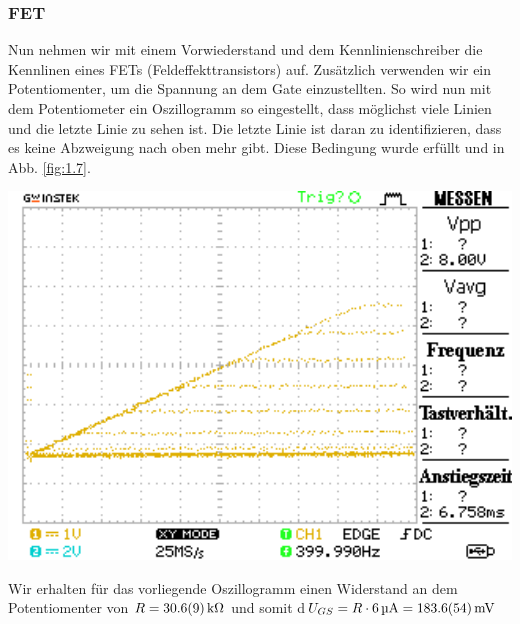 \documentclass[10pt]{article}
\newenvironment{Figure}
  {\par\medskip\noindent\minipage{\linewidth}}
  {\endminipage\par\medskip}
\begin{document}
\begin{multicols}{2}
	\subsubsection*{FET}
	Nun nehmen wir mit einem Vorwiederstand und dem Kennlinienschreiber die Kennlinen eines FETs (Feldeffekttransistors) auf. Zusätzlich verwenden wir ein Potentiomenter, um die Spannung an dem Gate einzustellten. So wird nun mit dem Potentiometer ein Oszillogramm so eingestellt, dass möglichst viele Linien und die letzte Linie zu sehen ist. Die letzte Linie ist daran zu identifizieren, dass es keine Abzweigung nach oben mehr gibt. Diese Bedingung wurde erfüllt und in Abb. \ref{fig:1.7}.
	\begin{Figure}
		\centering\includegraphics[width=1\textwidth]{../data/DS0000.png}
		\label{fig:1.7}
	\end{Figure}
	Wir erhalten für das vorliegende Oszillogramm einen Widerstand an dem Potentiomenter von $R=\SI{30.6+-0.9}{\kilo\Omega}$ und somit d$U_{GS}=R\cdot \SI{6}{\micro A}=\SI{183.6+-5.4}{\milli V}$


\end{multicols}
\end{document}
